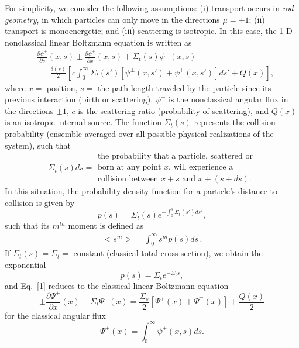 \documentclass{anstrans}
\newcommand{\bl}{\big<}
\newcommand{\bg}{\big>}
\begin{document}
For simplicity, we consider the following assumptions: (i) transport occurs in \textit{rod geometry}, in which particles can only move in the directions $\mu=\pm 1$; (ii) transport is monoenergetic; and (iii) scattering is isotropic. In this case, the 1-D nonclassical linear Boltzmann equation is written as
\begin{align}
\label{1}
&\frac{\partial\psi^\pm}{\partial s}(x,s) \pm\frac{\partial\psi^\pm}{\partial x} (x,s) + \Sigma_t(s)\psi^\pm(x,s)\\
&\,\,= \frac{\delta(s)}{2}\left[ c\int_0^\infty \Sigma_t(s')\left[\psi^\pm(x,s') + \psi^\mp(x,s')\right]ds'+ Q(x) \right], \nonumber
\end{align}
where $x =$ position, $s =$ the path-length traveled by the particle since its previous
interaction (birth or scattering), $\psi^\pm$ is the nonclassical angular flux in the directions $\pm 1$, $c$ is the scattering ratio (probability of scattering), and $Q(x)$ is an isotropic internal source. The function $\Sigma_t(s)$ represents the collision probability (ensemble-averaged over all possible physical realizations of the system), such that
\begin{equation}
\Sigma_t(s)ds = \begin{array}{l}
\text{the probability that a particle, scattered or}\\
\text{born at any point $x$, will experience a}\\
\text{collision between $x + s$ and $x + (s+ds)$.}
\end{array} \nonumber
 \end{equation}
In this situation, the probability density function for a particle's distance-to-collision is given by
\begin{equation}\label{2}
p(s) = \Sigma_t(s)e^{-\int_0^s \Sigma_t(s')ds'}, 
\end{equation}
such that its $m^{th}$ moment is defined as
\begin{align}
\bl s^m \bg = \int_0^{\infty}s^mp(s)ds\,.\nonumber
\end{align}
If $\Sigma_t(s) = \Sigma_t = $ constant (classical total cross section), we obtain the exponential
\begin{equation}
p(s) = \Sigma_t e^{-\Sigma_ts},\label{3}
\end{equation}
and Eq.\ \eqref{1} reduces to the classical linear Boltzmann equation
\begin{equation}
\pm \frac{\partial \Psi^\pm}{\partial x}(x) + \Sigma_t \Psi^\pm(x) = \frac{\Sigma_s}{2}\left[\Psi^\pm(x)+\Psi^\mp(x)\right]+ \frac{Q(x)}{2} \nonumber
\end{equation}
for the classical angular flux 
\begin{equation}
\Psi^\pm(x) = \int_0^\infty \psi^\pm(x,s)ds. \nonumber
\end{equation} 
\end{document}
